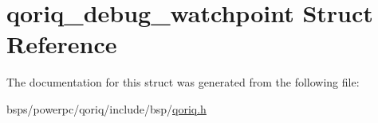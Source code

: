 \hypertarget{structqoriq__debug__watchpoint}{}\section{qoriq\+\_\+debug\+\_\+watchpoint Struct Reference}
\label{structqoriq__debug__watchpoint}


The documentation for this struct was generated from the following file\+:\begin{DoxyCompactItemize}
\item 
bsps/powerpc/qoriq/include/bsp/\mbox{\hyperlink{qoriq_8h}{qoriq.\+h}}\end{DoxyCompactItemize}
